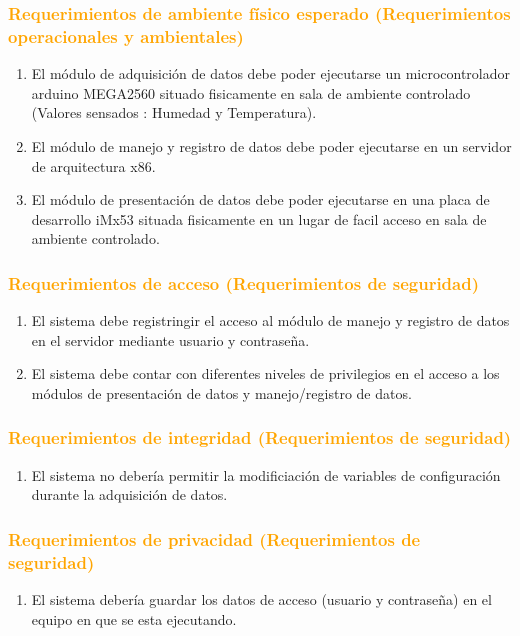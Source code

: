 \subsubsection{\textcolor{orange}{Requerimientos de ambiente físico esperado
(Requerimientos operacionales y ambientales)}}
\begin{enumerate}
\item El módulo de adquisición de datos debe poder ejecutarse un
microcontrolador arduino MEGA2560 situado fisicamente en sala de ambiente
controlado (Valores sensados : Humedad y Temperatura).
\item El módulo de manejo y registro de datos debe poder ejecutarse en un
servidor de arquitectura x86.
\item El módulo de presentación de datos debe poder ejecutarse en una placa de
desarrollo iMx53 situada fisicamente en un lugar de facil acceso en sala de
ambiente controlado.
\end{enumerate}

\subsubsection{\textcolor{orange}{Requerimientos de acceso (Requerimientos de
seguridad)}}
\begin{enumerate}
\item El sistema debe registringir el acceso al módulo de manejo y registro de
datos en el servidor mediante usuario y contraseña. 
\item El sistema debe contar con diferentes niveles de privilegios en el acceso
a los módulos de presentación de datos y manejo/registro de datos.
\end{enumerate}

\subsubsection{\textcolor{orange}{Requerimientos de integridad (Requerimientos
de seguridad)}}
\begin{enumerate}
\item El sistema no debería permitir la modificiación de variables de
configuración durante la adquisición de datos.
\end{enumerate}

\subsubsection{\textcolor{orange}{Requerimientos de privacidad (Requerimientos
de seguridad)}}
\begin{enumerate}
\item El sistema debería guardar los datos de acceso (usuario y contraseña) en
el equipo en que se esta ejecutando. 
\end{enumerate}

